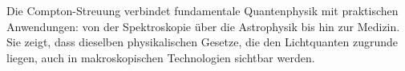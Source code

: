 \begin{PhysikBox}[Zusammenfassung]
	Die Compton-Streuung verbindet fundamentale Quantenphysik mit praktischen
	Anwendungen: von der Spektroskopie über die Astrophysik bis hin zur Medizin.
	Sie zeigt, dass dieselben physikalischen Gesetze, die den Lichtquanten
	zugrunde liegen, auch in makroskopischen Technologien sichtbar werden.
\end{PhysikBox}
